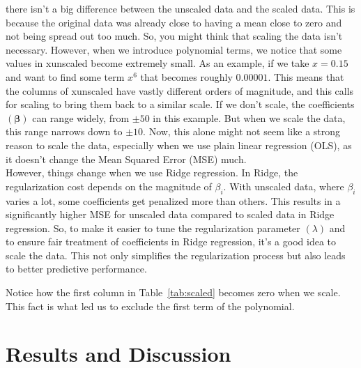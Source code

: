 \documentclass[twoside,11pt]{report}
\begin{document}
there isn't a big difference between the unscaled data and the scaled data. 
This is because the original data was already close to having a mean close to zero and not being spread out too much. 
So, you might think that scaling the data isn't necessary.
However, when we introduce polynomial terms, we notice that some values in xunscaled become extremely small. As an example, 
if we take $x=0.15$ and want to find some term $x^6$ that becomes roughly $0.00001$. This means that the columns of xunscaled have vastly different orders of magnitude, and this calls 
for scaling to bring them back to a similar scale.
If we don't scale, the coefficients $(\boldsymbol{\beta})$ can range widely, from $\pm 50$ in this example. 
But when we scale the data, this range narrows 
down to $\pm 10$. Now, this alone might not seem like a strong reason to scale the data, especially when we use plain 
linear regression (OLS), as it doesn't change the Mean Squared Error (MSE) much.\\
However, things change when we use Ridge regression. In Ridge, the regularization cost depends on the magnitude of $\beta_i$.
With unscaled data, where $\beta_i$ varies a lot, some coefficients get penalized more than others. This results in a 
significantly higher MSE for unscaled data compared to scaled data in Ridge regression.
So, to make it easier to tune the regularization parameter $(\lambda)$ and to ensure fair treatment of coefficients in Ridge regression, 
it's a good idea to scale the data. This not only simplifies the regularization process but also leads to better predictive performance.

Notice how the first column in Table~\ref{tab:scaled} becomes zero when we scale. This fact is what led us to exclude the first term of the polynomial.

















\newpage
\section{Results and Discussion}
\label{sec:resultsdiscussion}
\end{document}
